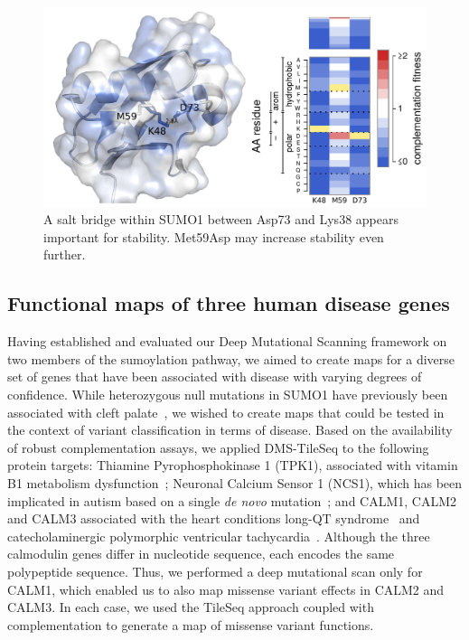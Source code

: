 \begin{figure}[h!]
	\centering
	\includegraphics[width=\textwidth]{img/saltbridge.pdf}
	\caption{A salt bridge within SUMO1 between Asp73 and Lys38 appears important for stability. Met59Asp may increase stability even further.}
	\label{fig:saltbridge}
\end{figure}






\subsection{Functional maps of three human disease genes}

Having established and evaluated our Deep Mutational Scanning framework on two members of the sumoylation pathway, we aimed to create maps for a diverse set of genes that have been associated with disease with varying degrees of confidence. While  heterozygous null mutations in SUMO1 have previously been associated with cleft palate~\cite{andreou_tbx22_2007}, we wished to create maps that could be tested in the context of variant classification in terms of disease. Based on the availability of robust complementation assays, we applied DMS-TileSeq to the following protein targets: Thiamine Pyrophosphokinase 1 (TPK1), associated with vitamin B1 metabolism dysfunction~\cite{mayr_thiamine_2011}; Neuronal Calcium Sensor 1 (NCS1), which has been implicated in autism based on a single \textit{de novo} mutation~\cite{handley_structural_2010};  and CALM1, CALM2 and CALM3 associated with the heart conditions long-QT syndrome~\cite{crotti_calmodulin_2013} and catecholaminergic polymorphic ventricular tachycardia~\cite{nyegaard_mutations_2012}. Although the three calmodulin genes differ in nucleotide sequence, each encodes the same polypeptide sequence. Thus, we performed a deep mutational scan only for CALM1, which enabled us to also map missense variant effects in CALM2 and CALM3. In each case, we used the TileSeq approach coupled with complementation to generate a map of missense variant functions. 


